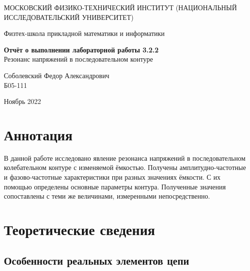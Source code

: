 \documentclass[a4paper,12pt]{article} %
\date{\today}
\begin{document}
\begin{titlepage}
	\begin{center}
		{\large МОСКОВСКИЙ ФИЗИКО-ТЕХНИЧЕСКИЙ ИНСТИТУТ (НАЦИОНАЛЬНЫЙ ИССЛЕДОВАТЕЛЬСКИЙ УНИВЕРСИТЕТ)}
	\end{center}
	\begin{center}
		{\large Физтех-школа прикладной математики и информатики}
	\end{center}
	
	
	\vspace{4.5cm}
	{\huge
		\begin{center}
			{\bf Отчёт о выполнении лабораторной работы 3.2.2}\\
			Резонанс напряжений в последовательном контуре
		\end{center}
	}
	\vspace{1cm}
	\begin{center}
		{\large Соболевский Федор Александрович \\
			\vspace{0.2cm}
			Б05-111}
	\end{center}
	\vspace{8cm}
	\begin{center}
		Ноябрь 2022
	\end{center}
\end{titlepage}

\section{Аннотация}

В данной работе исследовано явление резонанса напряжений в последовательном
колебательном контуре с изменяемой ёмкостью. Получены амплитудно-частотные и фазово-частотные характеристики при разных значениях ёмкости. С их помощью определены основные параметры контура. Полученные значения сопоставлены с теми же величинами, измеренными непосредственно. 

\section{Теоретические сведения}

\subsection{Особенности реальных элементов цепи}
\end{document}
